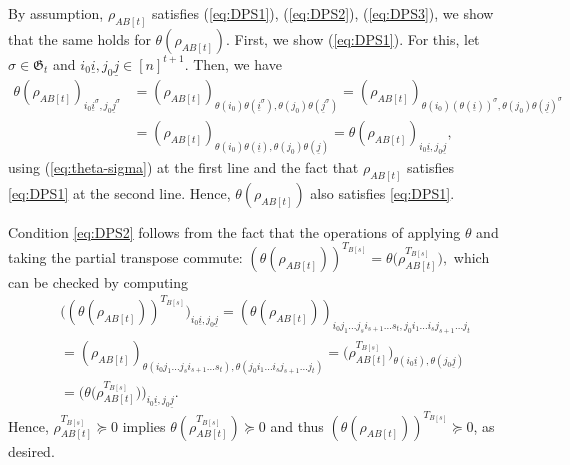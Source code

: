 \documentclass[11pt]{article}
\makeatletter
\newcommand{\Perm}{\mathfrak G}
\newcommand{\ui}{\underline{i}}
\newcommand{\uj}{\underline{j}}
\theoremstyle{plain}
\renewenvironment{proof}[1][\proofname]{%
  \par
  \pushQED{}%
  \normalfont
  \topsep6\p@\@plus6\p@
  \trivlist
  \item[\hskip\labelsep\itshape #1\@addpunct{.}]%
}{%
  \popQED
  \endtrivlist
}
\makeatother
\begin{document}
\begin{proof}
  By assumption,   $\rho_{AB[t]}$ satisfies (\ref{eq:DPS1}),  (\ref{eq:DPS2}), (\ref{eq:DPS3}), we show that the same holds for $\theta(\rho_{AB[t]})$.
First, we show (\ref{eq:DPS1}). For this,    let $\sigma\in \Perm_t$ and $i_0\ui,j_0\uj\in [n]^{t+1}$. Then, we have
    \begin{align*}
        \theta(\rho_{AB[t]})_{i_0\ui^\sigma,j_0\uj^\sigma}&=(\rho_{AB[t]})_{\theta(i_0)\theta(\ui^\sigma),\theta(j_0)\theta(\uj^\sigma)}
        =(\rho_{AB[t]})_{\theta(i_0)(\theta(\ui))^\sigma,\theta(j_0)\theta(\uj)^\sigma}\\
        &=(\rho_{AB[t]})_{\theta(i_0)\theta(\ui),\theta(j_0)\theta(\uj)}
        =\theta(\rho_{AB[t]})_{i_0\ui,j_0\uj},
    \end{align*}
using (\ref{eq:theta-sigma}) at the first line and the fact that $\rho_{AB[t]}$ satisfies \eqref{eq:DPS1} at the second line. Hence, $\theta(\rho_{AB[t]})$ also satisfies \eqref{eq:DPS1}.

    Condition \eqref{eq:DPS2} follows from the fact that the operations of applying $\theta$ and taking the partial transpose commute:
       $ \left(\theta(\rho_{AB[t]})\right)^{T_{B[s]}}=\theta\big(\rho_{AB[t]}^{T_{B[s]}}\big),$
 which can be checked by computing
    \begin{align*}
    &    \big( \left(\theta(\rho_{AB[t]})\right)^{T_{B[s]}}\big)_{i_0\ui,j_0\uj} =
        \left(\theta(\rho_{AB[t]})\right)_{i_0j_1\dots j_si_{s+1}\dots s_t,j_0i_1\dots i_sj_{s+1}\dots j_t}\\
        &=(\rho_{AB[t]})_{\theta(i_0j_1\dots j_si_{s+1}\dots s_t),\theta(j_0i_1\dots i_sj_{s+1}\dots j_t)}
        =\big(\rho_{AB[t]}^{T_{B[s]}}\big)_{\theta(i_0\ui),\theta(j_0\uj)}\\
       & =\big(\theta\big(\rho_{AB[t]}^{T_{B[s]}}\big)\big)_{i_0\ui,j_0\uj}.
    \end{align*}
 Hence, $\rho_{AB[t]}^{T_{B[s]}}\succeq 0$ implies $\theta(\rho_{AB[t]}^{T_{B[s]}})\succeq 0$ and thus
  $(\theta(\rho_{AB[t]}))^{T_{B[s]}}\succeq 0$, as desired. 
      

\end{proof}
\end{document}
